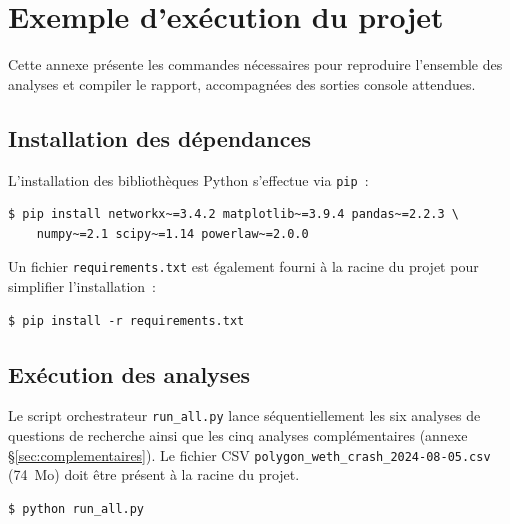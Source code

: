 
\section{Exemple d'ex\'ecution du projet}
\label{ann:execution}

Cette annexe pr\'esente les commandes n\'ecessaires pour reproduire l'ensemble des analyses et compiler le rapport, accompagn\'ees des sorties console attendues.


\subsection{Installation des d\'ependances}

L'installation des biblioth\`eques Python s'effectue via \texttt{pip}~:

\begin{lstlisting}[language={}, numbers=none, caption={Installation des d\'ependances Python}]
$ pip install networkx~=3.4.2 matplotlib~=3.9.4 pandas~=2.2.3 \
    numpy~=2.1 scipy~=1.14 powerlaw~=2.0.0
\end{lstlisting}

Un fichier \texttt{requirements.txt} est \'egalement fourni \`a la racine du projet pour simplifier l'installation~:

\begin{lstlisting}[language={}, numbers=none, caption={Installation via requirements.txt}]
$ pip install -r requirements.txt
\end{lstlisting}


\subsection{Ex\'ecution des analyses}

Le script orchestrateur \texttt{run\_all.py} lance s\'equentiellement les six analyses de questions de recherche ainsi que les cinq analyses compl\'ementaires (annexe \S\ref{sec:complementaires}). Le fichier CSV \texttt{polygon\_weth\_crash\_2024-08-05.csv} (74~Mo) doit \^etre pr\'esent \`a la racine du projet.

\begin{lstlisting}[language={}, numbers=none, caption={Lancement de l'orchestrateur}]
$ python run_all.py
\end{lstlisting}

